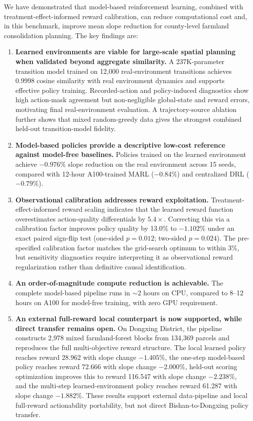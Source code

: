 \documentclass[11pt]{article}
\begin{document}
We have demonstrated that model-based reinforcement learning, combined with treatment-effect-informed reward calibration, can reduce computational cost and, in this benchmark, improve mean slope reduction for county-level farmland consolidation planning. The key findings are:

\begin{enumerate}
\item \textbf{Learned environments are viable for large-scale spatial planning when validated beyond aggregate similarity.} A 237K-parameter transition model trained on 12{,}000 real-environment transitions achieves 0.9998 cosine similarity with real environment dynamics and supports effective policy training. Recorded-action and policy-induced diagnostics show high action-mask agreement but non-negligible global-state and reward errors, motivating final real-environment evaluation. A trajectory-source ablation further shows that mixed random-greedy data gives the strongest combined held-out transition-model fidelity.

\item \textbf{Model-based policies provide a descriptive low-cost reference against model-free baselines.} Policies trained on the learned environment achieve $-0.976\%$ slope reduction on the real environment across 15 seeds, compared with 12-hour A100-trained MARL ($-0.84\%$) and centralized DRL ($-0.79\%$).

\item \textbf{Observational calibration addresses reward exploitation.} Treatment-effect-informed reward scaling indicates that the learned reward function overestimates action-quality differentials by $5.4\times$. Correcting this via a calibration factor improves policy quality by 13.0\% to $-1.102\%$ under an exact paired sign-flip test (one-sided $p=0.012$; two-sided $p=0.024$). The pre-specified calibration factor matches the grid-search optimum to within 3\%, but sensitivity diagnostics require interpreting it as observational reward regularization rather than definitive causal identification.

\item \textbf{An order-of-magnitude compute reduction is achievable.} The complete model-based pipeline runs in $\sim$2 hours on CPU, compared to 8--12 hours on A100 for model-free training, with zero GPU requirement.

\item \textbf{An external full-reward local counterpart is now supported, while direct transfer remains open.} On Dongxing District, the pipeline constructs 2{,}978 mixed farmland-forest blocks from 134{,}369 parcels and reproduces the full multi-objective reward structure. The local learned policy reaches reward 28.962 with slope change $-1.405\%$, the one-step model-based policy reaches reward 72.666 with slope change $-2.000\%$, held-out scoring optimization improves this to reward 116.547 with slope change $-2.238\%$, and the multi-step learned-environment policy reaches reward 61.287 with slope change $-1.882\%$. These results support external data-pipeline and local full-reward actionability portability, but not direct Bishan-to-Dongxing policy transfer.


\end{enumerate}
\end{document}
